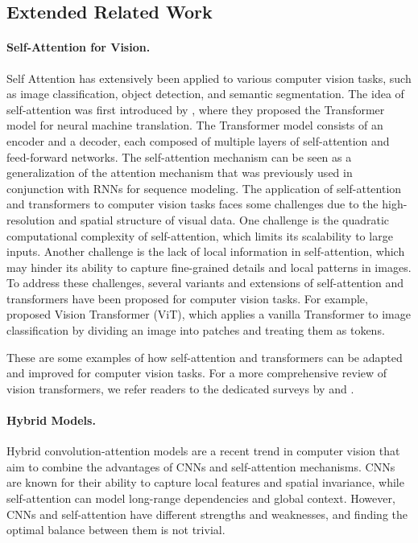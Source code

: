 \documentclass{article} \usepackage{iclr2023_conference,times}
\begin{document}
\subsection{Extended Related Work}
\label{extended related work}

\paragraph{Self-Attention for Vision.} Self Attention has extensively been applied to various computer vision tasks, such as image classification, object detection, and semantic segmentation. The idea of self-attention was first introduced by \cite{vaswani2017attention}, where they proposed the Transformer model for neural machine translation. The Transformer model consists of an encoder and a decoder, each composed of multiple layers of self-attention and feed-forward networks. The self-attention mechanism can be seen as a generalization of the attention mechanism that was previously used in conjunction with RNNs for sequence modeling. The application of self-attention and transformers to computer vision tasks faces some challenges due to the high-resolution and spatial structure of visual data. One challenge is the quadratic computational complexity of self-attention, which limits its scalability to large inputs. Another challenge is the lack of local information in self-attention, which may hinder its ability to capture fine-grained details and local patterns in images. To address these challenges, several variants and extensions of self-attention and transformers have been proposed for computer vision tasks. For example, \cite{dosovitskiy2021an} proposed Vision Transformer (ViT), which applies a vanilla Transformer to image classification by dividing an image into patches and treating them as tokens.

These are some examples of how self-attention and transformers can be adapted and improved for computer vision tasks. For a more comprehensive review of vision transformers, we refer readers to the dedicated surveys by \cite{10.1145/3505244} and \cite{9716741}.

\paragraph{Hybrid Models.} Hybrid convolution-attention models are a recent trend in computer vision that aim to combine the advantages of CNNs and self-attention mechanisms. CNNs are known for their ability to capture local features and spatial invariance, while self-attention can model long-range dependencies and global context. However, CNNs and self-attention have different strengths and weaknesses, and finding the optimal balance between them is not trivial.
\end{document}
